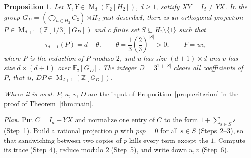 \documentclass[11pt]{article}
\newtheorem{proposition}[theorem]{Proposition}
\theoremstyle{remark}
\numberwithin{equation}{section}
\newcommand{\F}{\mathbb F}
\newcommand{\Z}{\mathbb Z}
\newcommand{\Mat}{\operatorname{M}}
\begin{document}
\begin{proposition}\label{prop:separation}
Let $X,Y\in\Mat_d(\F_2[H_2])$, $d\ge1$, satisfy
$XY=I_d\ne YX$. In the group
$G_D=(\bigoplus_{h\in H_2}C_3)\rtimes H_2$ just described, there is an orthogonal
projection $P\in\Mat_{d+1}(\Z[1/3][G_D])$ and a finite set
$S\subseteq H_2\setminus\{1\}$ such that
\[
 \tau_{d+1}(P)=d+\theta,\qquad
 \theta=\frac13\left(\frac23\right)^{|S|}>0,
 \qquad \bar P=uv,
\]
where $\bar P$ is the reduction of $P$ modulo $2$, and $u$ has size $(d+1)\times d$ and $v$ has size $d\times(d+1)$
over $\F_2[G_D]$. The integer $D=3^{1+|S|}$ clears all coefficients
of $P$, that is, $DP\in\Mat_{d+1}(\Z[G_D])$.
\end{proposition}

\noindent\emph{Where it is used.} $P$, $u$, $v$, $D$ are the input of Proposition~\ref{prop:criterion} in the proof of Theorem~\ref{thm:main}.

\noindent\emph{Plan.} Put $C=I_d-YX$ and normalize one entry of $C$ to the form $1+\sum_{s\in S}s$ (Step~1). Build a rational projection $p$ with $psp=0$ for all $s\in S$ (Steps~2--3), so that sandwiching between two copies of $p$ kills every term except the $1$. Compute its trace (Step~4), reduce modulo $2$ (Step~5), and write down $u,v$ (Step~6).
\end{document}
